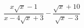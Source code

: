 \begin{ex}
	\begin{condition}
		\( \dfrac{x\sqrt{x}-1}{x-4\sqrt{x}+3}-\dfrac{\sqrt{x}+10}{\sqrt{x}-3} \)
	\end{condition}
\end{ex}